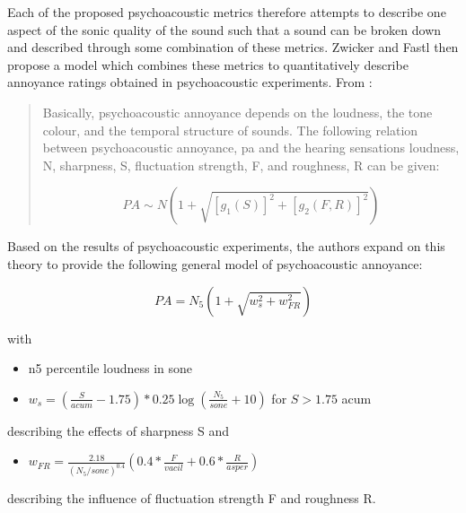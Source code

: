 Each of the proposed psychoacoustic metrics therefore attempts to describe one aspect of the sonic quality of the sound such that a sound can be broken down and described through some combination of these metrics. Zwicker and Fastl then propose a model which combines these metrics to quantitatively describe annoyance ratings obtained in psychoacoustic experiments. From \citet[p. 327]{PsychoacousticsfactsmodelsZwicker}:

\begin{quotation}
  Basically, psychoacoustic annoyance depends on the loudness, the tone colour, and the temporal structure of sounds. The following relation between psychoacoustic annoyance, \gls{pa} and the hearing sensations loudness, N, sharpness, S, fluctuation strength, F, and roughness, R can be given:

  \begin{equation}
    \label{eqn:pa1}
    PA \sim N( 1 + \sqrt{[g_1(S)]^2 + [g_2(F, R)]^2})
  \end{equation}

\end{quotation}


Based on the results of psychoacoustic experiments, the authors expand on this theory to provide the following general model of psychoacoustic annoyance:

\begin{equation}
  PA = N_5 ( 1 + \sqrt{w^2_s + w^2_{FR}})
\end{equation}

with 

\begin{itemize}
  \item \gls{n5} percentile loudness in sone
  \item $w_s = (\frac{S}{acum} - 1.75) * 0.25 \log{(\frac{N_5}{sone} + 10)}$ for $S > 1.75$ acum
\end{itemize}

describing the effects of sharpness S and 

\begin{itemize}
  \item $w_{FR} = \frac{2.18}{(N_5/sone)^{0.4}} (0.4 * \frac{F}{vacil} + 0.6 * \frac{R}{asper})$
\end{itemize}

describing the influence of fluctuation strength F and roughness R.


